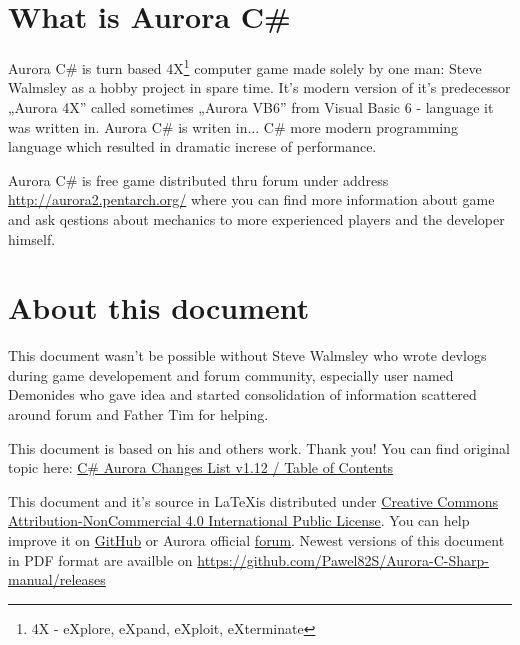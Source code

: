 \documentclass[../Aurora C# unofficial manual.tex]{subfiles}
\begin{document}
	\section{What is Aurora C\#}
	Aurora C\# is turn based 4X\footnote{4X - eXplore, eXpand, eXploit, eXterminate}
	computer game made solely by one man: Steve Walmsley as a hobby project in spare time.
	It's modern version of it's predecessor „Aurora 4X” called sometimes „Aurora VB6” from
	Visual Basic 6 - language it was written in. Aurora C\# is writen in... C\# more modern
	programming language which resulted in dramatic increse of performance.
	
	Aurora C\# is free game distributed thru forum under address
	\href{http://aurora2.pentarch.org/}{http://aurora2.pentarch.org/} where you can find
	more information about game and ask qestions about mechanics to more experienced
	players and the developer himself.
	
	
	\section{About this document}
	This document wasn't be possible without Steve Walmsley who wrote devlogs during game
	developement and forum community, especially user named Demonides who gave idea and
	started consolidation of information scattered around forum and Father Tim for helping.
	
	This document is based on his and others work. Thank you! You can find original topic
	here: \href{http://aurora2.pentarch.org/index.php?topic=10666.0}{C\# Aurora Changes List v1.12 / Table of Contents}
	
	This document and it's source in \LaTeX is distributed under \href{https://creativecommons.org/licenses/by-nc/4.0/}{Creative Commons Attribution-NonCommercial 4.0 International Public License}. You can help improve it
	on \href{https://github.com/Pawel82S/Aurora-C-Sharp-manual}{GitHub} or Aurora official \href{http://aurora2.pentarch.org/}{forum}. Newest versions of this document in PDF format are availble on \href{https://github.com/Pawel82S/Aurora-C-Sharp-manual/releases}{https://github.com/Pawel82S/Aurora-C-Sharp-manual/releases}
\end{document}
